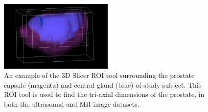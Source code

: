 \begin{figure}[htb!]
\centering
\includegraphics[width=0.5\textwidth]{tyler/ROI_methods.png}
\caption{An example of the 3D Slicer ROI tool surrounding the prostate capsule (magenta)
    and central gland (blue) of study subject. This ROI tool is used to find the
    tri-axial dimensions of the prostate, in both the ultrasound and MR image
    datasets.}
\label{fig:roi_tool} 
\end{figure}
